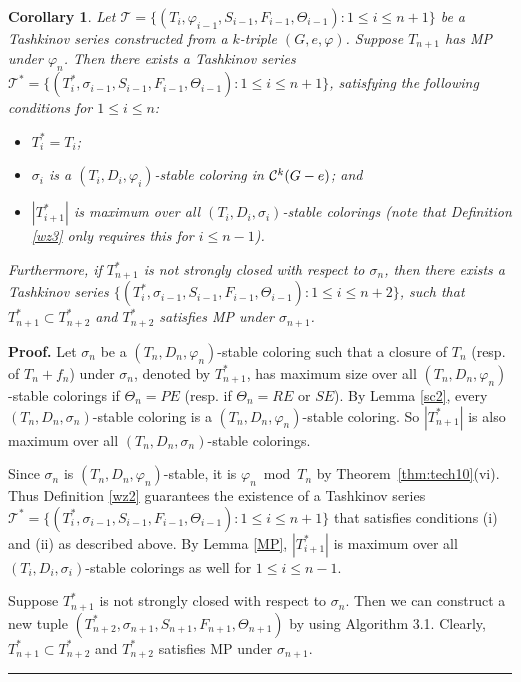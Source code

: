\documentclass[11pt]{article}
\newtheorem{corollary}[theorem]{Corollary}
\newcommand{\TT}{\mathcal {T}}
\newcommand{\phiv}{\varphi}
\def\qed{\hfill \rule{4pt}{7pt}}
\begin{document}
\begin{corollary}\label{welldefined}
Let $\TT=\{(T_i, \phiv_{i-1}, S_{i-1}, F_{i-1}, \Theta_{i-1}): 1\le i \le n+1\}$ be a Tashkinov series  
constructed from a $k$-triple $(G,e, \varphi)$. Suppose $T_{n+1}$ has MP under $\varphi_n$.
Then there exists a Tashkinov series $\TT^*=\{(T_i^*, \sigma_{i-1}, S_{i-1}, F_{i-1}, \Theta_{i-1}): 1\le i \le n+1\}$, 
satisfying the following conditions for $1\le i \le n$:
\begin{itemize}
\vspace{-1mm}
\item[(i)] $T_i^*=T_i$;
\vspace{-2mm}
\item[(ii)] $\sigma_i$ is a $(T_i, D_i, \varphi_i)$-stable coloring in ${\cal C}^k(G-e)$; and 
\vspace{-2mm}
\item[(iii)] $|T_{i+1}^*|$ is maximum over all $(T_i, D_i, \sigma_i)$-stable colorings (note that Definition \ref{wz3} only requires 
this for $i\leq n-1$). 
\vspace{-1mm}
\end{itemize}
Furthermore, if $T_{n+1}^*$ is not strongly closed with respect to $\sigma_n$, then there exists a Tashkinov series 
$\{(T_i^*, \sigma_{i-1}, S_{i-1}, F_{i-1}, \Theta_{i-1}): 1\le i \le n+2\}$, such that $T_{n+1}^* \subset T_{n+2}^*$
and $T_{n+2}^*$ satisfies MP under $\sigma_{n+1}$. 
\end{corollary}	

{\bf Proof.} Let $\sigma_n$ be a $(T_n, D_n, \varphi_n)$-stable coloring such that a closure of $T_n$ (resp. of $T_n+f_n$) under $\sigma_n$, 
denoted by $T^*_{n+1}$, has maximum size over all $(T_n, D_n, \varphi_n)$-stable colorings if $\Theta_n=PE$ (resp. if $\Theta_n=RE$ or $SE$). 
By Lemma \ref{sc2}, every $(T_n, D_n, \sigma_n)$-stable coloring is a 
$(T_n, D_n, \varphi_n)$-stable coloring. So $|T_{n+1}^*|$ is also maximum over all $(T_n, D_n, \sigma_n)$-stable colorings.

Since $\sigma_n$ is $(T_n, D_n, \varphi_n)$-stable, it is $\phiv_n\bmod T_n$ by Theorem~\ref{thm:tech10}(vi). 
Thus Definition \ref{wz2} guarantees the existence of a 
Tashkinov series $\TT^*=\{(T_i^*, \sigma_{i-1}, S_{i-1}, F_{i-1}, \Theta_{i-1}): 1\le i \le n+1\}$ that satisfies conditions (i) 
and (ii) as described above. By Lemma \ref{MP}, $|T_{i+1}^*|$ is maximum over all $(T_i, D_i, \sigma_i)$-stable 
colorings as well for $1\le i \le n-1$.   

Suppose $T_{n+1}^*$ is not strongly closed with respect to $\sigma_n$. Then we can construct a new tuple  
$(T_{n+2}^*, \sigma_{n+1}, S_{n+1}, F_{n+1}, \Theta_{n+1})$ by using Algorithm 3.1. Clearly, $T_{n+1}^* \subset T_{n+2}^*$
and $T_{n+2}^*$ satisfies MP under $\sigma_{n+1}$. \qed 
\end{document}
